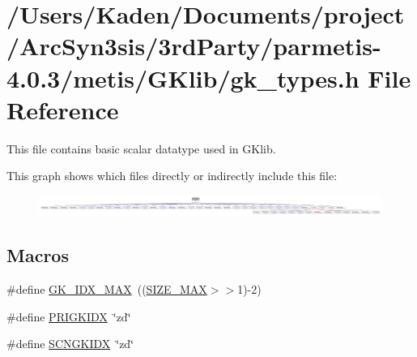 \hypertarget{a00083}{}\section{/\+Users/\+Kaden/\+Documents/project/\+Arc\+Syn3sis/3rd\+Party/parmetis-\/4.0.3/metis/\+G\+Klib/gk\+\_\+types.h File Reference}
\label{a00083}


This file contains basic scalar datatype used in G\+Klib.  


This graph shows which files directly or indirectly include this file\+:\nopagebreak
\begin{figure}[H]
\begin{center}
\leavevmode
\includegraphics[width=350pt]{a00085}
\end{center}
\end{figure}
\subsection*{Macros}
\begin{DoxyCompactItemize}
\item 
\#define \hyperlink{a00083_a5f23e1e9c19eedc136068e052eb003f2}{G\+K\+\_\+\+I\+D\+X\+\_\+\+M\+AX}~((\hyperlink{a00119_a3c75bb398badb69c7577b21486f9963f}{S\+I\+Z\+E\+\_\+\+M\+AX}$>$$>$1)-\/2)
\item 
\#define \hyperlink{a00083_af42253014fa44e9d15f58cc05f685982}{P\+R\+I\+G\+K\+I\+DX}~\char`\"{}zd\char`\"{}
\item 
\#define \hyperlink{a00083_aaf1a3f8bba4ecb7b872c491703be1780}{S\+C\+N\+G\+K\+I\+DX}~\char`\"{}zd\char`\"{}
\end{DoxyCompactItemize}
